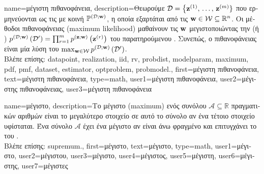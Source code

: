 {name={\foreignlanguage{greek}{μέγιστη πιθανοφάνεια}}, 
	description={\foreignlanguage{greek}{Θεωρούμε}  
		$\mathcal{D}=\big\{ {\bf z}^{(1)}, \,\ldots, \,{\bf z}^{(m)} \}$ \foreignlanguage{greek}{που ερμηνεύονται ως τις}
		   \foreignlanguage{greek}{με κοινή}  
		$\mathbb{P}^{(\mathcal{D};{\bf w})}$, \foreignlanguage{greek}{η οποία εξαρτάται από τις}  
		${\bf w} \in \mathcal{W} \subseteq \mathbb{R}^{n}$. 
		\foreignlanguage{greek}{Οι μέθοδοι}  \foreignlanguage{greek}{πιθανοφάνειας} (maximum likelihood) 
		\foreignlanguage{greek}{μαθαίνουν τις}  ${\bf w}$ \foreignlanguage{greek}{μεγιστοποιώντας την}  
		 (\foreignlanguage{greek}{ή} ) 
		$p^{(\mathcal{D};{\bf w})}\left(\mathcal{D}'\right) = \prod_{r=1}^{m} 
		p^{({\bf z};{\bf w})}\left({\bf z}^{(r)}\right)$ 
		\foreignlanguage{greek}{του παρατηρούμενου} . \foreignlanguage{greek}{Συνεπώς, ο} 
		 \foreignlanguage{greek}{πιθανοφάνειας είναι μία λύση του}  
		$\max_{{\bf w} \in \mathcal{W}} p^{(\mathcal{D};{\bf w})}\left(\mathcal{D}'\right)$.
		\\
		\foreignlanguage{greek}{Βλέπε επίσης:} \gls{datapoint}, \gls{realization}, \gls{iid}, \gls{rv}, \gls{probdist}, \gls{modelparam}, 
		\gls{maximum}, \gls{pdf}, \gls{pmf}, \gls{dataset}, \gls{estimator}, \gls{optproblem}, \gls{probmodel}.},
	first={\foreignlanguage{greek}{μέγιστη πιθανοφάνεια}},
	text={\foreignlanguage{greek}{μέγιστη πιθανοφάνεια}},
	type=math,
	user1={\foreignlanguage{greek}{μέγιστη πιθανοφάνεια}}, %
  	user2={\foreignlanguage{greek}{μέγιστης πιθανοφά\-νει\-ας}}, %
	user3={\foreignlanguage{greek}{μέγιστη πιθανοφάνεια}} %
}

{name={\foreignlanguage{greek}{μέγιστο}},
     description={\foreignlanguage{greek}{Το μέγιστο} (maximum) \foreignlanguage{greek}{ενός συνόλου} 
		$\mathcal{A} \subseteq \mathbb{R}$ \foreignlanguage{greek}{πραγματικών αριθμών είναι το μεγαλύτερο στοιχείο σε αυτό το σύνολο 
		αν ένα τέτοιο στοιχείο υφίσταται. Ένα σύνολο $\mathcal{A}$ έχει ένα μέγιστο αν είναι άνω φραγμένο και 
		επιτυγχάνει το}  \foreignlanguage{greek}{του} 
		\cite[\foreignlanguage{greek}{Ενότητα}~1.4]{RudinBookPrinciplesMatheAnalysis}.
		\\
		\foreignlanguage{greek}{Βλέπε επίσης:} \gls{supremum}.},
 	first={\foreignlanguage{greek}{μέγιστο}},
 	text={\foreignlanguage{greek}{μέγιστο}},
	type=math,
 	user1={\foreignlanguage{greek}{μέγιστο}}, %
 	user2={\foreignlanguage{greek}{μέγιστου}}, %
 	user3={\foreignlanguage{greek}{μέγιστο}}, %
 	user4={\foreignlanguage{greek}{μέγιστος}}, %
 	user5={\foreignlanguage{greek}{μέγιστη}}, %
	user6={\foreignlanguage{greek}{μέγιστης}}, %
	user7={\foreignlanguage{greek}{μέγιστες}} %
}

